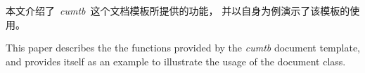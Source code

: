 
\cleardoublepage
\begin{cabstract}

	本文介绍了~\emph{cumtb}~这个文档模板所提供的功能，
	并以自身为例演示了该模板的使用。

\end{cabstract}

\cleardoublepage
\begin{eabstract}

	This paper describes the the functions provided by
	the \emph{cumtb} document template,
	and provides itself as an example to illustrate
	the usage of the document class.

\end{eabstract}

